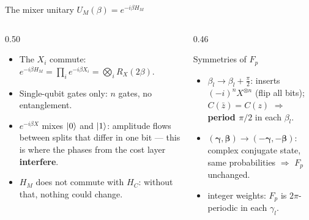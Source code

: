 \documentclass[aspectratio=169,11pt]{beamer}
\newcommand{\key}[1]{{\color{qdark}\textbf{#1}}}
\newcommand{\bg}{\boldsymbol\gamma}
\newcommand{\bb}{\boldsymbol\beta}
\begin{document}
\begin{frame}{The mixer unitary $U_M(\beta) = e^{-i\beta H_M}$}
  \begin{columns}[T]
    \begin{column}{0.50\textwidth}
      \begin{itemize}
        \item The $X_i$ commute: $e^{-i\beta H_M} = \prod_i e^{-i\beta X_i} = \bigotimes_i R_X(2\beta)$.
        \item Single-qubit gates only: $n$ gates, no entanglement.
        \item $e^{-i\beta X}$ mixes $\ket0$ and $\ket1$: amplitude flows between splits that differ in one bit --- this is
          where the phases from the cost layer \key{interfere}.
        \item $H_M$ does not commute with $H_C$: without that, nothing could change.
      \end{itemize}
    \end{column}
    \begin{column}{0.46\textwidth}
      \begin{block}{Symmetries of $F_p$}
        \begin{itemize}
          \item $\beta_l \to \beta_l + \frac\pi2$: inserts $(-i)^nX^{\otimes n}$ (flip all bits); $C(\bar z) = C(z)$ $\Rightarrow$
            \key{period $\pi/2$} in each $\beta_l$.
          \item $(\bg,\bb) \to (-\bg,-\bb)$: complex conjugate state, same probabilities $\Rightarrow$ $F_p$ unchanged.
          \item integer weights: $F_p$ is $2\pi$-periodic in each $\gamma_l$.
        \end{itemize}
      \end{block}
    \end{column}
  \end{columns}
\end{frame}
\end{document}
